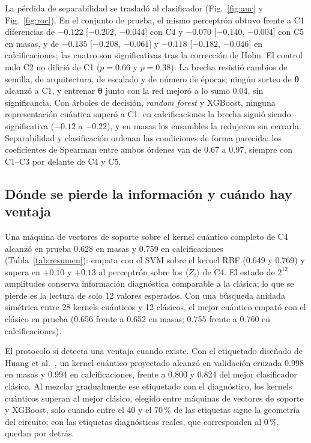 \documentclass[conference,letterpaper]{IEEEtran}
\begin{document}
La pérdida de separabilidad se trasladó al clasificador (Fig.~\ref{fig:auc} y Fig.~\ref{fig:roc}). En el conjunto de prueba, el mismo perceptrón obtuvo frente a C1 diferencias de $-0.122$ [$-0.202$, $-0.044$] con C4 y $-0.070$ [$-0.140$, $-0.004$] con C5 en masas, y de $-0.135$ [$-0.208$, $-0.061$] y $-0.118$ [$-0.182$, $-0.046$] en calcificaciones; las cuatro son significativas tras la corrección de Holm. El control nulo C2 no difirió de C1 ($p = 0.66$ y $p = 0.38$). La brecha resistió cambios de semilla, de arquitectura, de escalado y de número de épocas; ningún sorteo de $\boldsymbol{\theta}$ alcanzó a C1, y entrenar $\boldsymbol{\theta}$ junto con la red mejoró a lo sumo 0.04, sin significancia. Con árboles de decisión, \textit{random forest} y XGBoost, ninguna representación cuántica superó a C1: en calcificaciones la brecha siguió siendo significativa ($-0.12$ a $-0.22$), y en masas los ensambles la redujeron sin cerrarla. Separabilidad y clasificación ordenan las condiciones de forma parecida: los coeficientes de Spearman entre ambos órdenes van de 0.67 a 0.97, siempre con C1--C3 por delante de C4 y C5.

\subsection{Dónde se pierde la información y cuándo hay ventaja}

Una máquina de vectores de soporte sobre el kernel cuántico completo de C4 alcanzó en prueba 0.628 en masas y 0.759 en calcificaciones (Tabla~\ref{tab:resumen}): empata con el SVM sobre el kernel RBF (0.649 y 0.769) y supera en $+0.10$ y $+0.13$ al perceptrón sobre los $\langle Z_i \rangle$ de C4. El estado de $2^{12}$ amplitudes conserva información diagnóstica comparable a la clásica; lo que se pierde es la lectura de solo 12 valores esperados. Con una búsqueda anidada simétrica entre 28 kernels cuánticos y 12 clásicos, el mejor cuántico empató con el clásico en prueba (0.656 frente a 0.652 en masas; 0.755 frente a 0.760 en calcificaciones).

El protocolo sí detecta una ventaja cuando existe. Con el etiquetado diseñado de Huang et al.~\cite{huang2021power}, un kernel cuántico proyectado alcanzó en validación cruzada 0.998 en masas y 0.994 en calcificaciones, frente a 0.800 y 0.824 del mejor clasificador clásico. Al mezclar gradualmente ese etiquetado con el diagnóstico, los kernels cuánticos superan al mejor clásico, elegido entre máquinas de vectores de soporte y XGBoost, solo cuando entre el 40 y el 70\,\% de las etiquetas sigue la geometría del circuito; con las etiquetas diagnósticas reales, que corresponden al 0\,\%, quedan por detrás.
\end{document}
